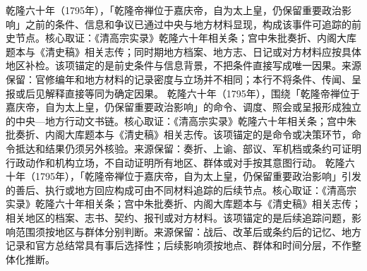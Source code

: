 乾隆六十年（1795年），「乾隆帝禅位于嘉庆帝，自为太上皇，仍保留重要政治影响」之前的条件、信息和争议已通过中央与地方材料显现，构成该事件可追踪的前史节点。核心取证：《清高宗实录》乾隆六十年相关条；宫中朱批奏折、内阁大库题本与《清史稿》相关志传；同时期地方档案、地方志、日记或对方材料应按具体地区补检。该项锚定的是前史条件与信息背景，不把条件直接写成唯一因果。来源保留：官修编年和地方材料的记录密度与立场并不相同；本行不将条件、传闻、呈报或后见解释直接等同为确定因果。
乾隆六十年（1795年），围绕「乾隆帝禅位于嘉庆帝，自为太上皇，仍保留重要政治影响」的命令、调度、照会或呈报形成独立的中央—地方行动文书链。核心取证：《清高宗实录》乾隆六十年相关条；宫中朱批奏折、内阁大库题本与《清史稿》相关志传。该项锚定的是命令或决策环节，命令抵达和结果仍须另外核验。来源保留：奏折、上谕、部议、军机档或条约可证明行政动作和机构立场，不自动证明所有地区、群体或对手按其意图行动。
乾隆六十年（1795年），「乾隆帝禅位于嘉庆帝，自为太上皇，仍保留重要政治影响」引发的善后、执行或地方回应构成可由不同材料追踪的后续节点。核心取证：《清高宗实录》乾隆六十年相关条；宫中朱批奏折、内阁大库题本与《清史稿》相关志传；相关地区的档案、志书、契约、报刊或对方材料。该项锚定的是后续追踪问题，影响范围须按地区与群体分别判断。来源保留：战后、改革后或条约后的记忆、地方记录和官方总结常具有事后选择性；后续影响须按地点、群体和时间分层，不作整体化推断。
